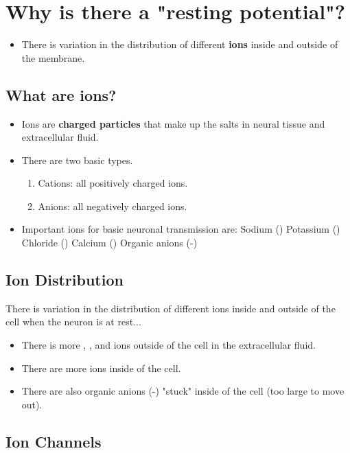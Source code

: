 \documentclass[12pt,a4paper]{article}
\begin{document}
	\section{Why is there a "resting potential"?}
	
	\begin{itemize}
		\item There is variation in the distribution of different \textbf{ions} inside and outside of the membrane. 
	\end{itemize}
	
	\subsection{What are ions?}
	\begin{itemize}
		\item Ions are \textbf{charged particles} that make up the salts in neural tissue and extracellular fluid. 
		\item There are two basic types. 
		\begin{enumerate}
			\item Cations: all positively charged ions. 
			\item Anions: all negatively charged ions. 
		\end{enumerate}
		\item Important ions for basic neuronal transmission are:
		\subitem Sodium ()
		\subitem Potassium ()
		\subitem Chloride ()
		\subitem Calcium ()
		\subitem Organic anions (-)
	\end{itemize}
	\subsection{Ion Distribution}
	
	There is variation in the distribution of different ions inside and outside of the cell when the neuron is at rest...
	\begin{itemize}
		\item There is more , , and  ions outside of the cell in the extracellular fluid. 
		\item There are more  ions inside of the cell. 
		\item There are also organic anions (-) "stuck" inside of  the cell (too large to move out).
	\end{itemize}
	
	\subsection{Ion Channels}
	
\end{document}
